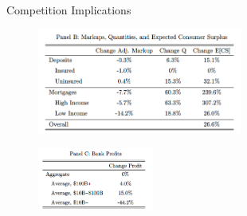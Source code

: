 \documentclass[notes,10pt, aspectratio=169]{beamer}
\begin{document}
            \begin{frame}{Competition Implications}\label{comp_implications}   


                \begin{figure}
                    \centering
                    \includegraphics[width=0.6\textwidth]{imgs/tab12b.png}
                \end{figure}
                
                \begin{figure}
                    \centering
                    \includegraphics[width=0.34\textwidth]{imgs/tab12c.png}
                \end{figure}
            \end{frame}
\end{document}
